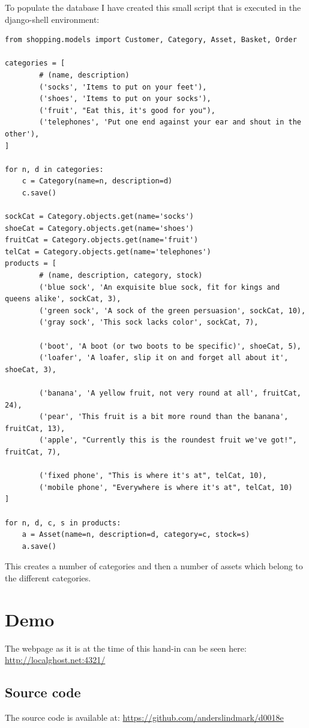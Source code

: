 \documentclass[12pt, a4paper,titlepage]{article}
\begin{document}
To populate the database I have created this small script that is executed in the
django-shell environment:
\lstset{language=Python}
\begin{lstlisting}
from shopping.models import Customer, Category, Asset, Basket, Order

categories = [ 
        # (name, description)
        ('socks', 'Items to put on your feet'),
        ('shoes', 'Items to put on your socks'),
        ('fruit', "Eat this, it's good for you"),
        ('telephones', 'Put one end against your ear and shout in the other'),
]   

for n, d in categories:
    c = Category(name=n, description=d)
    c.save()

sockCat = Category.objects.get(name='socks')
shoeCat = Category.objects.get(name='shoes')
fruitCat = Category.objects.get(name='fruit')
telCat = Category.objects.get(name='telephones')
products = [ 
        # (name, description, category, stock)
        ('blue sock', 'An exquisite blue sock, fit for kings and queens alike', sockCat, 3), 
        ('green sock', 'A sock of the green persuasion', sockCat, 10),
        ('gray sock', 'This sock lacks color', sockCat, 7), 

        ('boot', 'A boot (or two boots to be specific)', shoeCat, 5), 
        ('loafer', 'A loafer, slip it on and forget all about it', shoeCat, 3), 
    
        ('banana', 'A yellow fruit, not very round at all', fruitCat, 24),
        ('pear', 'This fruit is a bit more round than the banana', fruitCat, 13),
        ('apple', "Currently this is the roundest fruit we've got!", fruitCat, 7), 

        ('fixed phone', "This is where it's at", telCat, 10),
        ('mobile phone', "Everywhere is where it's at", telCat, 10) 
]   

for n, d, c, s in products:
    a = Asset(name=n, description=d, category=c, stock=s)
    a.save()
\end{lstlisting}
This creates a number of categories and then a number of assets which
belong to the different categories.

\section{Demo}
The webpage as it is at the time of this hand-in can be seen here:
\url{http://localghost.net:4321/}
\subsection{Source code}
The source code is available at: 
\url{https://github.com/anderslindmark/d0018e}
\end{document}
